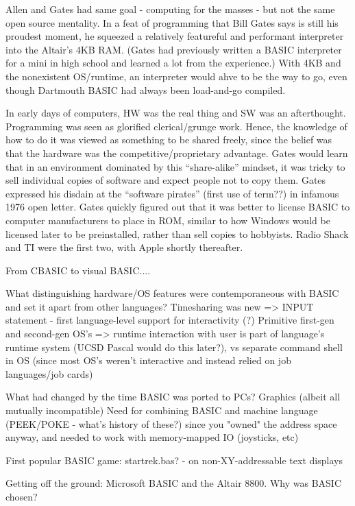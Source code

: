 \documentclass{article}
\begin{document}
Allen and Gates had same goal - computing for the masses - but not the
same open source mentality.  In a feat of programming that Bill Gates
says is still his proudest moment, he squeezed a relatively featureful
and performant interpreter into the Altair's 4KB RAM.  (Gates had
previously written a BASIC interpreter for  a mini in high school and
learned a lot from the experience.)  With 4KB and the nonexistent
OS/runtime, an interpreter would ahve to be the way to go, even though
Dartmouth BASIC had always been load-and-go compiled.

In early days of computers, HW was the real thing and SW was an
afterthought.  Programming was seen as glorified clerical/grunge work.
Hence, the knowledge of how to do it was viewed as something to be
shared freely, since the belief was that the hardware was the
competitive/proprietary advantage.
Gates would learn that in an environment dominated by this
``share-alike'' mindset, it was
tricky to sell individual copies of software and expect people not to
copy them.  Gates
expressed his disdain at the ``software pirates'' (first use of term??) in infamous
1976 open letter.
Gates quickly figured out that it was better to license BASIC to
computer manufacturers to place in ROM, similar to how Windows would be
licensed later to be preinstalled, rather than sell copies to
hobbyists.  Radio Shack and TI were the first two, with Apple shortly
thereafter.  

From CBASIC to visual BASIC....

What distinguishing hardware/OS features were contemporaneous with BASIC
and set it apart from other languages?
   Timesharing was new => INPUT statement - first language-level support for
     interactivity  (?)
   Primitive first-gen and second-gen OS's => runtime interaction with
     user is part of language's runtime system (UCSD Pascal would do
     this later?), vs separate command shell in OS (since most OS's
     weren't interactive and instead relied on job languages/job cards)

What had changed by the time BASIC was ported to PCs?
   Graphics (albeit all mutually incompatible)
   Need for combining BASIC and machine language (PEEK/POKE - what's
   history of these?) since you "owned" the address space anyway, and
   needed to work with memory-mapped IO (joysticks, etc)

First popular BASIC game: startrek.bas?
  - on non-XY-addressable text displays

Getting off the ground: Microsoft BASIC and the Altair 8800.  Why was
    BASIC chosen?
\end{document}
